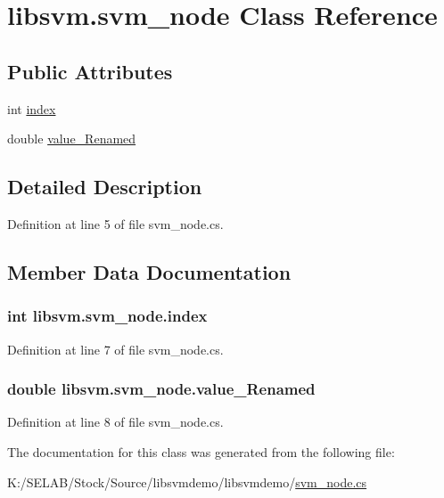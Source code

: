 \hypertarget{classlibsvm_1_1svm__node}{
\section{libsvm.svm\_\-node Class Reference}
\label{classlibsvm_1_1svm__node}
}
\subsection*{Public Attributes}
\begin{DoxyCompactItemize}
\item 
int \hyperlink{classlibsvm_1_1svm__node_a8142fd40ad6cba00eafe8fcdae30684b}{index}
\item 
double \hyperlink{classlibsvm_1_1svm__node_ab02e6681ab472687059784edd46dcb80}{value\_\-Renamed}
\end{DoxyCompactItemize}


\subsection{Detailed Description}


Definition at line 5 of file svm\_\-node.cs.



\subsection{Member Data Documentation}
\hypertarget{classlibsvm_1_1svm__node_a8142fd40ad6cba00eafe8fcdae30684b}{
\subsubsection[{index}]{\setlength{\rightskip}{0pt plus 5cm}int {\bf libsvm.svm\_\-node.index}}}
\label{classlibsvm_1_1svm__node_a8142fd40ad6cba00eafe8fcdae30684b}


Definition at line 7 of file svm\_\-node.cs.

\hypertarget{classlibsvm_1_1svm__node_ab02e6681ab472687059784edd46dcb80}{
\subsubsection[{value\_\-Renamed}]{\setlength{\rightskip}{0pt plus 5cm}double {\bf libsvm.svm\_\-node.value\_\-Renamed}}}
\label{classlibsvm_1_1svm__node_ab02e6681ab472687059784edd46dcb80}


Definition at line 8 of file svm\_\-node.cs.



The documentation for this class was generated from the following file:\begin{DoxyCompactItemize}
\item 
K:/SELAB/Stock/Source/libsvmdemo/libsvmdemo/\hyperlink{svm__node_8cs}{svm\_\-node.cs}\end{DoxyCompactItemize}
